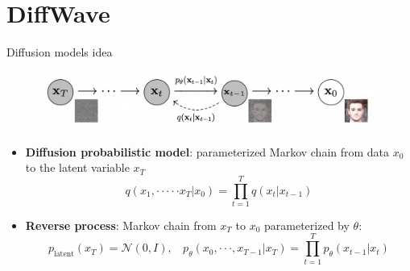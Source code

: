 \section{DiffWave}
\begin{frame}{Diffusion models idea}
        \begin{figure}
    	\centering
    	\includegraphics[width=0.99\linewidth]{figs/diffusion.png}
    \end{figure}
    \begin{itemize}
        \item \textbf{Diffusion probabilistic model}: parameterized Markov chain from data $x_0$ to the latent variable $x_T$
        $$q(x_{1},\cdot\cdot\cdot\cdot\cdot x_{T}|x_{0})=\prod_{t=1}^{T}q(x_{t}|x_{t-1})$$
        
        \item \textbf{Reverse process}: Markov chain from $x_T$ to $x_0$ parameterized by $\theta$:
        $$p_{\mathrm{latent}}(x_{T})=\mathcal{N}(0,I),\ ~~~p_{\theta}(x_{0},\cdot\cdot\cdot,x_{T-1}|x_{T})=\prod_{t=1}^{T}p_{\theta}(x_{t-1}|x_{t})$$
        
    \end{itemize}
    

\end{frame}
